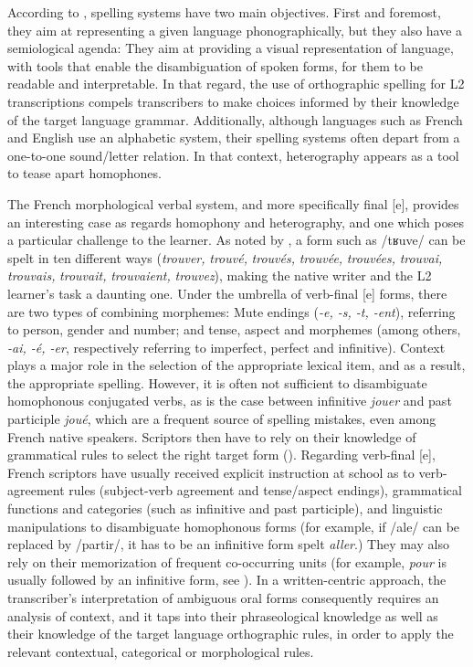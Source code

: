 \documentclass[output=paper,colorlinks,citecolor=brown,modfonts,nonflat]{../langscibook}
\begin{document}
According to \citet{Jaffré2006}, spelling systems have two main objectives. First and foremost, they aim at representing a given language phonographically, but they also have a semiological agenda: They aim at providing a visual representation of language, with tools that enable the disambiguation of spoken forms, for them to be readable and interpretable. In that regard, the use of orthographic spelling for L2 transcriptions compels transcribers to make choices informed by their knowledge of the target language grammar. Additionally, although languages such as French and English use an alphabetic system, their spelling systems often depart from a one-to-one sound/letter relation. In that context, heterography appears as a tool to tease apart homophones. 

The French morphological verbal system, and more specifically final [e], provides an interesting case as regards homophony and heterography, and one which poses a particular challenge to the learner. As noted by \citet{BrissaudEtAl2006}, a form such as /tʁuve/ can be spelt in ten different ways (\textit{trouver,} \textit{trouvé,} \textit{trouvés,} \textit{trouvée,} \textit{trouvées,} \textit{trouvai,} \textit{trouvais,} \textit{trouvait,} \textit{trouvaient,} \textit{trouvez}), making the native writer and the L2 learner’s task a daunting one. Under the umbrella of verb-final [e] forms, there are two types of combining morphemes: Mute endings (\textit{{}-e, -s, -t, -ent}), referring to person, gender and number; and tense, aspect and morphemes (among others, \textit{{}-ai, -é, -er}, respectively referring to imperfect, perfect and infinitive). Context plays a major role in the selection of the appropriate lexical item, and as a result, the appropriate spelling. However, it is often not sufficient to disambiguate homophonous conjugated verbs, as is the case between infinitive \textit{jouer} and past participle \textit{joué}, which are a frequent source of spelling mistakes, even among French native speakers. Scriptors then have to rely on their knowledge of grammatical rules to select the right target form (\citealt{DavidEtAl2006,BrissaudEtAl2006}). Regarding verb-final [e], French scriptors have usually received explicit instruction at school as to verb-agreement rules (subject-verb agreement and tense/aspect endings), grammatical functions and categories (such as infinitive and past participle), and linguistic manipulations to disambiguate homophonous forms (for example, if /ale/ can be replaced by /partir/, it has to be an infinitive form spelt \textit{aller}.) They may also rely on their memorization of frequent co-occurring units (for example, \textit{pour} is usually followed by an infinitive form, see \citealt[78]{BrissaudEtAl2006}). In a written-centric approach, the transcriber’s interpretation of ambiguous oral forms consequently requires an analysis of context, and it taps into their phraseological knowledge as well as their knowledge of the target language orthographic rules, in order to apply the relevant contextual, categorical or morphological rules.
\end{document}
